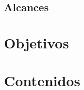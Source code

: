 
\subsection{Alcances}
\label{S1_3}



\section{Objetivos}
\label{S1_4}


\section{Contenidos}
\label{S1_5}

